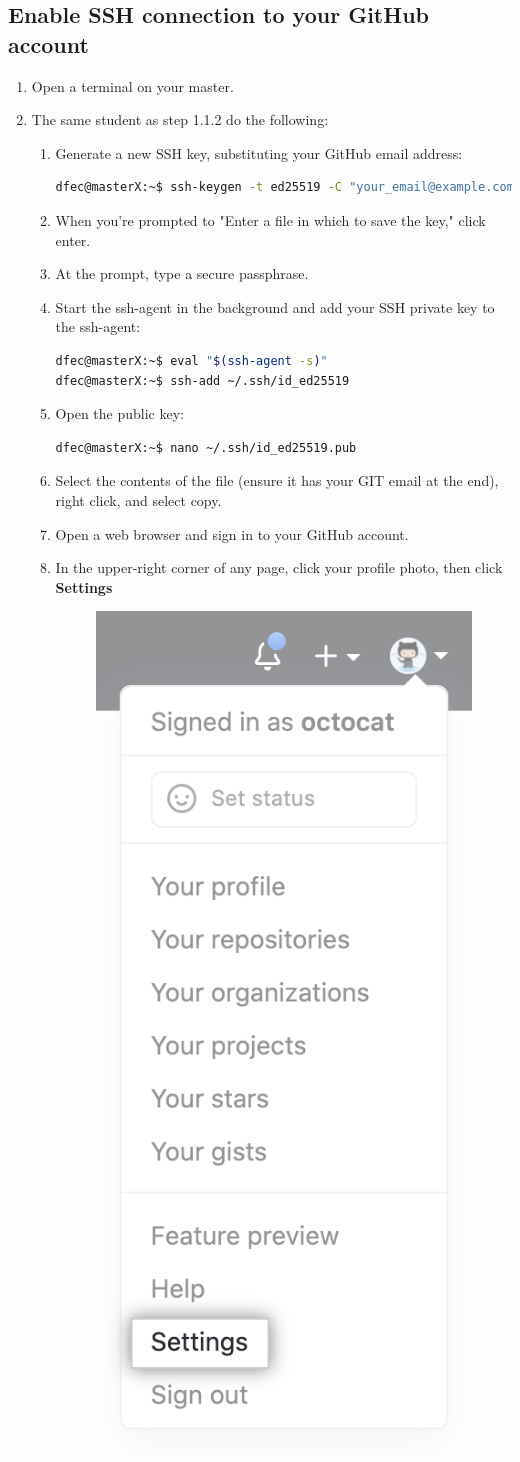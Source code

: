 \documentclass{handout}
\begin{document}
\subsection{Enable SSH connection to your GitHub account}
\begin{enumerate}
	\item Open a terminal on your master.
	\item The same student as step 1.1.2 do the following:
	\begin{enumerate}
		\item Generate a new SSH key, substituting your GitHub email address:
\begin{lstlisting}[language=bash]
dfec@masterX:~$ ssh-keygen -t ed25519 -C "your_email@example.com"
\end{lstlisting}
		\item When you're prompted to "Enter a file in which to save the key," click enter.
		\item At the prompt, type a secure passphrase.
		\item Start the ssh-agent in the background and add your SSH private key to the ssh-agent:
\begin{lstlisting}[language=bash]
dfec@masterX:~$ eval "$(ssh-agent -s)"
dfec@masterX:~$ ssh-add ~/.ssh/id_ed25519
\end{lstlisting}
		\item Open the public key:
\begin{lstlisting}[language=bash]
dfec@masterX:~$ nano ~/.ssh/id_ed25519.pub
\end{lstlisting}
		\item Select the contents of the file (ensure it has your GIT email at the end), right click, and select copy.
		\item Open a web browser and sign in to your GitHub account.
\newpage
\clearpage
\pagebreak
		\item In the upper-right corner of any page, click your profile photo, then click \textbf{Settings}
		\begin{figure}[H]
			\centering
			\includegraphics[width=.25\textwidth]{userbar-account-settings.PNG}
		\end{figure}


\end{enumerate}
\end{enumerate}
\end{document}
